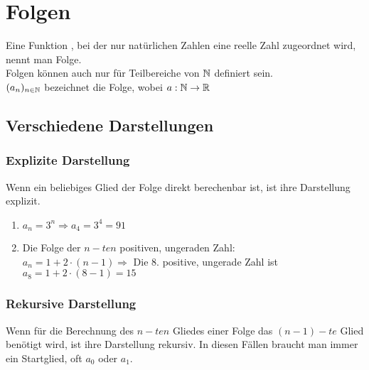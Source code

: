 \chapter{Folgen}

\begin{Definition}
Eine Funktion , bei der nur natürlichen Zahlen eine reelle Zahl zugeordnet wird, nennt man Folge.\\
Folgen können auch nur für Teilbereiche von $\mathbb{N}$ definiert sein.\\
$(a_{n})_{n\in\mathbb{N}}$ bezeichnet die Folge, wobei $a:\mathbb{N}\rightarrow\mathbb{R}$
\end{Definition}


		\section{Verschiedene Darstellungen}


	\subsection{Explizite Darstellung}

\begin{Definition}
Wenn ein beliebiges Glied der Folge direkt berechenbar ist, ist ihre Darstellung explizit.
\end{Definition}

\begin{Beispiel}
\begin{enumerate}
\item  $a_{n}=3^n \Rightarrow a_{4}=3^4=91$
\item Die Folge der $n-ten$ positiven, ungeraden Zahl:\\
$a_{n}=1+2\cdot(n-1) \Rightarrow$ Die 8. positive, ungerade Zahl ist $ a_{8}=1+2\cdot(8-1)=15$
\end{enumerate}
\end{Beispiel}


	\subsection{Rekursive Darstellung}

\begin{Definition}
Wenn für die Berechnung des $n-ten$ Gliedes einer Folge das $(n-1)-te$ Glied benötigt wird, ist ihre Darstellung rekursiv.
In diesen Fällen braucht man immer ein Startglied, oft $a_{0}$ oder $ a_{1}$.
\end{Definition}


